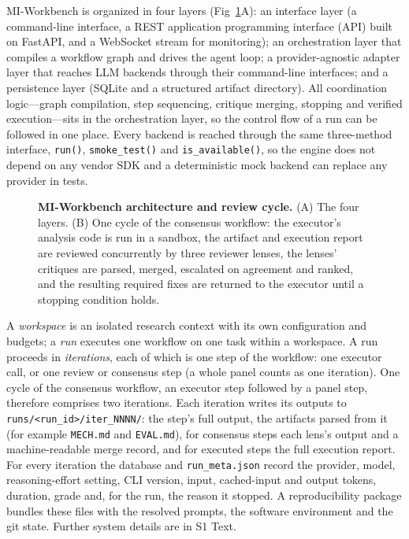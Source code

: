 \documentclass[10pt,letterpaper]{article}
\begin{document}
MI-Workbench is organized in four layers (Fig~\ref{fig1}A): an interface layer (a command-line interface, a REST application programming interface (API) built on FastAPI, and a WebSocket stream for monitoring); an orchestration layer that compiles a workflow graph and drives the agent loop; a provider-agnostic adapter layer that reaches LLM backends through their command-line interfaces; and a persistence layer (SQLite and a structured artifact directory). All coordination logic---graph compilation, step sequencing, critique merging, stopping and verified execution---sits in the orchestration layer, so the control flow of a run can be followed in one place. Every backend is reached through the same three-method interface, \texttt{run()}, \texttt{smoke\_test()} and \texttt{is\_available()}, so the engine does not depend on any vendor SDK and a deterministic mock backend can replace any provider in tests.

\begin{figure}[!h]
\caption{{\bf MI-Workbench architecture and review cycle.}
(A) The four layers. (B) One cycle of the consensus workflow: the executor's analysis code is run in a sandbox, the artifact and execution report are reviewed concurrently by three reviewer lenses, the lenses' critiques are parsed, merged, escalated on agreement and ranked, and the resulting required fixes are returned to the executor until a stopping condition holds.}
\label{fig1}
\end{figure}

A \emph{workspace} is an isolated research context with its own configuration and budgets; a \emph{run} executes one workflow on one task within a workspace. A run proceeds in \emph{iterations}, each of which is one step of the workflow: one executor call, or one review or consensus step (a whole panel counts as one iteration). One cycle of the consensus workflow, an executor step followed by a panel step, therefore comprises two iterations. Each iteration writes its outputs to \texttt{runs/<run\_id>/iter\_NNNN/}: the step's full output, the artifacts parsed from it (for example \texttt{MECH.md} and \texttt{EVAL.md}), for consensus steps each lens's output and a machine-readable merge record, and for executed steps the full execution report. For every iteration the database and \texttt{run\_meta.json} record the provider, model, reasoning-effort setting, CLI version, input, cached-input and output tokens, duration, grade and, for the run, the reason it stopped. A reproducibility package bundles these files with the resolved prompts, the software environment and the git state. Further system details are in S1 Text.
\end{document}
